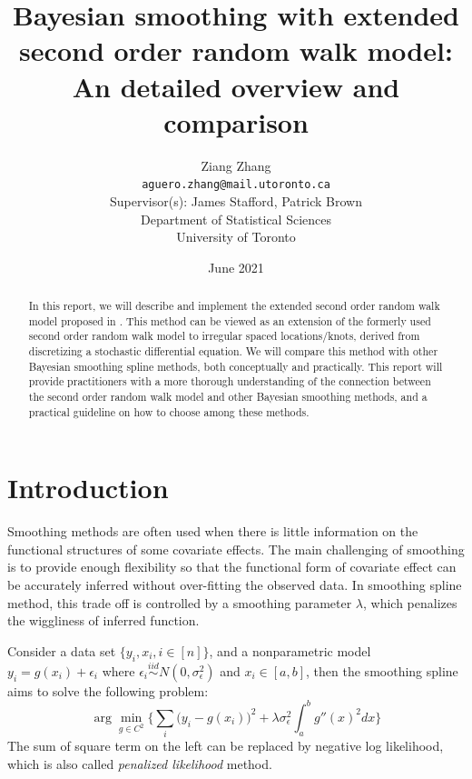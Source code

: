 \documentclass{article}
\title{\textbf{Bayesian smoothing with extended second order random walk model: An detailed overview and comparison}}
\author{
Ziang Zhang \\ \vspace{-0.3cm}\normalsize\texttt{aguero.zhang@mail.utoronto.ca}\\ 
\large
\vspace{0.5cm}
Supervisor(s): James Stafford, Patrick Brown \\ 

\vspace{0.5cm}
Department of Statistical Sciences \\
University of Toronto
}
\date{June 2021}
\begin{document}
\maketitle


\newpage

\begin{abstract}
In this report, we will describe and implement the extended second order random walk model proposed in \cite{rw2}. This method can be viewed as an extension of the formerly used second order random walk model to irregular spaced locations/knots, derived from discretizing a stochastic differential equation. We will compare this method with other Bayesian smoothing spline methods, both conceptually and practically. This report will provide practitioners with a more thorough understanding of the connection between the second order random walk model and other Bayesian smoothing methods, and a practical guideline on how to choose among these methods.
\end{abstract}




\section{Introduction}\label{intro}

Smoothing methods are often used when there is little information on the functional structures of some covariate effects. The main challenging of smoothing is to provide enough flexibility so that the functional form of covariate effect can be accurately inferred without over-fitting the observed data. In smoothing spline method, this trade off is controlled by a smoothing parameter $\lambda$, which penalizes the wiggliness of inferred function. 

Consider a data set $\{y_i,x_i, i\in [n]\}$, and a nonparametric model $y_i = g(x_i) + \epsilon_i$ where $\epsilon_i \overset{iid}\sim N(0,\sigma_\epsilon^2)$ and $x_i \in [a,b]$, then the smoothing spline aims to solve the following problem:
\begin{equation}\label{equ:ss}
\arg\min_{g\in C^2} \bigg\{ \sum_i\bigg(y_i-g(x_i)\bigg)^2 + \lambda \sigma_\epsilon^2 \int_a^b g''(x)^2 dx \bigg\}
\end{equation}
The sum of square term on the left can be replaced by negative log likelihood, which is also called \textit{penalized likelihood} method.
\end{document}
